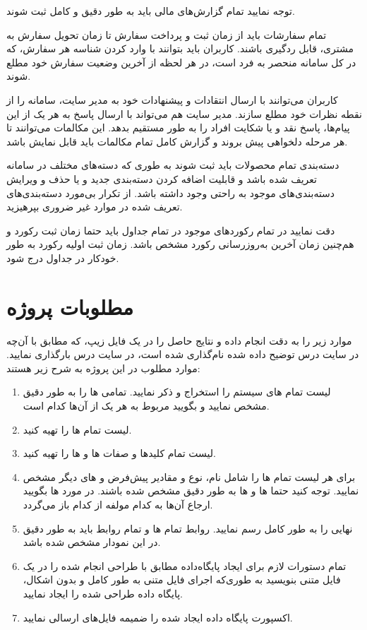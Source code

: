 \documentclass[12pt,a4paper]{article}
\begin{document}
\par
توجه نمایید تمام گزارش‌های مالی باید به طور دقیق و کامل ثبت شوند.
\par
تمام سفارشات باید از زمان ثبت و پرداخت سفارش تا زمان تحویل سفارش به مشتری، قابل ردگیری باشند. کاربران باید بتوانند با وارد کردن شناسه هر سفارش، که در کل سامانه منحصر به فرد است، در هر لحظه از آخرین وضعیت سفارش خود مطلع شوند.
\par
کاربران می‌توانند با ارسال انتقادات و پیشنهادات خود به مدیر سایت، سامانه را از نقطه نظرات خود مطلع سازند. مدیر سایت هم می‌تواند با ارسال پاسخ به هر یک از این پیام‌ها، پاسخ نقد و یا شکایت افراد را به طور مستقیم بدهد. این مکالمات می‌توانند تا هر مرحله‌ دلخواهی پیش بروند و گزارش کامل تمام مکالمات باید قابل نمایش باشد.
\par
دسته‌بندی تمام محصولات باید ثبت شوند به طوری که دسته‌های مختلف در سامانه تعریف شده باشد و قابلیت اضافه کردن دسته‌بندی جدید و یا حذف و ویرایش دسته‌بندی‌های موجود به راحتی وجود داشته باشد. از تکرار بی‌مورد دسته‌بندی‌های تعریف شده در موارد غیر ضروری بپرهیزید.
\par
دقت نمایید در تمام رکوردهای موجود در تمام جداول باید حتما زمان ثبت رکورد و هم‌چنین زمان آخرین به‌روزرسانی رکورد مشخص باشد. زمان ثبت اولیه رکورد به طور خودکار در جداول درج شود.

\section{مطلوبات پروژه} 
موارد زیر را به دقت انجام داده و نتایج حاصل را در یک فایل زیپ، که مطابق با آن‌چه در سایت درس توضیح داده شده نام‌گذاری شده است، در سایت درس بارگذاری نمایید. موارد مطلوب در این پروژه به شرح زیر هستند:


\begin{enumerate}
\item لیست تمام های سیستم را استخراج و ذکر نمایید. تمامی ها را به طور دقیق مشخص نمایید و بگویید   مربوط به هر یک از آن‌ها کدام است.

\item لیست تمام ها را تهیه کنید.


\item لیست تمام کلید‌ها و صفات ها و ها را تهیه کنید.

\item برای هر  لیست تمام ها را شامل نام، نوع و مقادیر پیش‌فرض و های دیگر مشخص نمایید. توجه کنید حتما ها و ها به طور دقیق مشخص شده باشند. در مورد ها بگویید ارجاع آن‌ها به کدام مولفه از کدام  باز می‌گردد.

\item {} نهایی را به طور کامل رسم نمایید. روابط تمام ها و  تمام روابط باید به طور دقیق در این نمودار مشخص شده باشد.

\item تمام دستورات لازم برای ایجاد پایگاه‌داده مطابق با طراحی انجام شده را در یک فایل متنی بنویسید به طوری‌که اجرای فایل متنی به طور کامل و بدون اشکال، پایگاه داده طراحی شده را ایجاد نمایید.

\item اکسپورت پایگاه داده ایجاد شده را ضمیمه فایل‌های ارسالی نمایید.
\end{enumerate}
\end{document}
